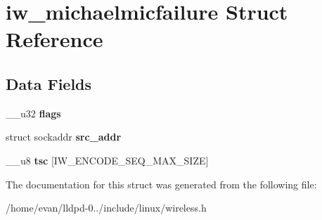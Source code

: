\section{iw\-\_\-michaelmicfailure \-Struct \-Reference}
\label{structiw__michaelmicfailure}
\subsection*{\-Data \-Fields}
\begin{DoxyCompactItemize}
\item 
\-\_\-\-\_\-u32 {\bfseries flags}\label{structiw__michaelmicfailure_a04a0bd666e371f3fab92b8d0ef5dbdb0}

\item 
struct sockaddr {\bfseries src\-\_\-addr}\label{structiw__michaelmicfailure_ac1dc52501d8d415dcf1b07208607348e}

\item 
\-\_\-\-\_\-u8 {\bfseries tsc} [\-I\-W\-\_\-\-E\-N\-C\-O\-D\-E\-\_\-\-S\-E\-Q\-\_\-\-M\-A\-X\-\_\-\-S\-I\-Z\-E]\label{structiw__michaelmicfailure_ae0acfcaf16ce0dc17b3c55008293d7ce}

\end{DoxyCompactItemize}


\-The documentation for this struct was generated from the following file\-:\begin{DoxyCompactItemize}
\item 
/home/evan/lldpd-\/0../include/linux/wireless.\-h\end{DoxyCompactItemize}
